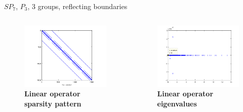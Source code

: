 \documentclass{beamer}
\begin{document}
\begin{frame}{$SP_7$, $P_3$, 3 groups, reflecting boundaries}

  \begin{columns}

    \begin{column}{0.5\textwidth}
      \begin{figure}[h!]
        \centering
        \includegraphics[width=2.5in,clip]{opSpySPn7P3G3.png}
        \caption{\textbf{Linear operator sparsity pattern}}
      \end{figure}
    \end{column}

    \begin{column}{0.5\textwidth}
      \begin{figure}[h!]
        \centering
        \includegraphics[width=2.5in,clip]{opSPn7P3G3.png}
        \caption{\textbf{Linear operator eigenvalues}}
      \end{figure}
    \end{column}

  \end{columns}

\end{frame}
\end{document}
